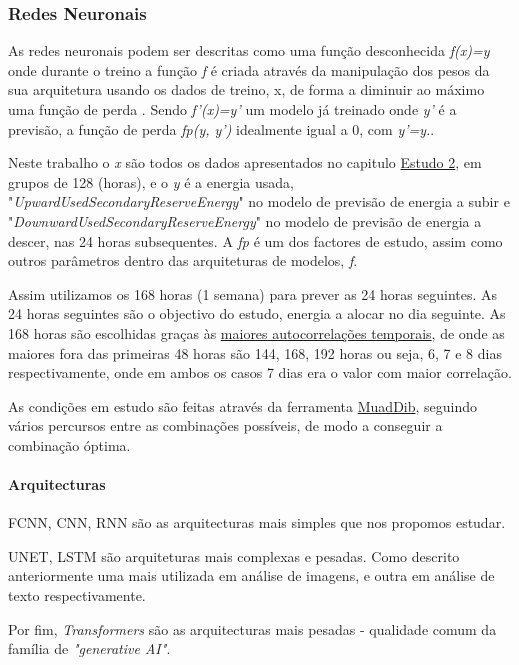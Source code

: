 \subsubsection{Redes Neuronais}

As redes neuronais podem ser descritas como uma função desconhecida \textit{f(x)=y} onde durante o treino a função \textit{f} é criada através da manipulação dos pesos da sua arquitetura usando os dados de treino, x, de forma a diminuir ao máximo uma função de perda . Sendo \textit{f'(x)=y'} um modelo já treinado onde \textit{y'} é a previsão, a função de perda \textit{fp(y, y')} idealmente igual a 0, com \textit{y'=y.}.\par
Neste trabalho o \textit{x} são todos os dados apresentados no capitulo \hyperref[ch:estudo_2]{Estudo 2}, em grupos de 128 (horas), e o \textit{y} é a energia usada, "\textit{UpwardUsedSecondaryReserveEnergy}" no modelo de previsão de energia a subir e "\textit{DownwardUsedSecondaryReserveEnergy}" no modelo de previsão de energia a descer, nas 24 horas subsequentes. A \textit{fp} é um dos factores de estudo, assim como outros parâmetros dentro das arquiteturas de modelos, \textit{f}.\par
Assim utilizamos os 168 horas (1 semana) para prever as 24 horas seguintes. As 24 horas seguintes são o objectivo do estudo, energia a alocar no dia seguinte. As 168 horas são escolhidas graças às \hyperref[tab:tempcorr]{maiores autocorrelações temporais}, de onde as maiores fora das primeiras 48 horas são 144, 168, 192 horas ou seja, 6, 7 e 8 dias respectivamente, onde em ambos os casos 7 dias era o valor com maior correlação.\par
As condições em estudo são feitas através da ferramenta \hyperref[se:muaddib]{MuadDib}, seguindo vários percursos entre as combinações possíveis, de modo a conseguir a combinação óptima.\par

\paragraph{Arquitecturas}
\text{ }  \par

\gls{FCNN}, \gls{CNN}, RNN são as arquitecturas mais simples que nos propomos estudar.\par
UNET, \gls{LSTM} são arquiteturas mais complexas e pesadas. Como descrito anteriormente uma mais utilizada em análise de imagens, e outra em análise de texto respectivamente.\par 
Por fim, \textit{Transformers} são as arquitecturas mais pesadas - qualidade comum da família de \textit{"generative AI"}.

